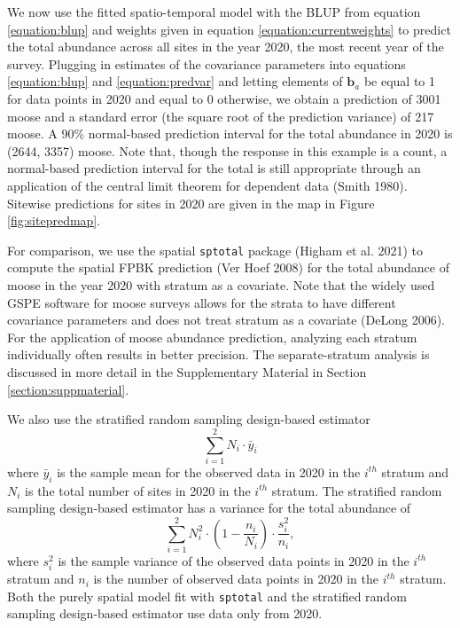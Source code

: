 \documentclass[smallextended]{svjour3}       %
\begin{document}
We now use the fitted spatio-temporal model with the BLUP from equation
\ref{equation:blup} and weights given in equation
\ref{equation:currentweights} to predict the total abundance across all
sites in the year 2020, the most recent year of the survey. Plugging in
estimates of the covariance parameters into equations
\ref{equation:blup} and \ref{equation:predvar} and letting elements of
\(\mathbf{b}_a\) be equal to 1 for data points in 2020 and equal to 0
otherwise, we obtain a prediction of 3001 moose and a standard error
(the square root of the prediction variance) of 217 moose. A 90\%
normal-based prediction interval for the total abundance in 2020 is
(2644, 3357) moose. Note that, though the response in this example is a
count, a normal-based prediction interval for the total is still
appropriate through an application of the central limit theorem for
dependent data (Smith 1980). Sitewise predictions for sites in 2020 are
given in the map in Figure \ref{fig:sitepredmap}.

For comparison, we use the spatial \texttt{sptotal} package (Higham et
al. 2021) to compute the spatial FPBK prediction (Ver Hoef 2008) for the
total abundance of moose in the year 2020 with stratum as a covariate.
Note that the widely used GSPE software for moose surveys allows for the
strata to have different covariance parameters and does not treat
stratum as a covariate (DeLong 2006). For the application of moose
abundance prediction, analyzing each stratum individually often results
in better precision. The separate-stratum analysis is discussed in more
detail in the Supplementary Material in Section
\ref{section:suppmaterial}.

We also use the stratified random sampling design-based estimator
\mbox{} \begin{equation*}
\sum_{i = 1}^{2} N_i \cdot \bar{y}_i
\end{equation*} \noindent where \(\bar{y}_i\) is the sample mean for the
observed data in 2020 in the \(i^{th}\) stratum and \(N_i\) is the total
number of sites in 2020 in the \(i^{th}\) stratum. The stratified random
sampling design-based estimator has a variance for the total abundance
of \mbox{} \begin{equation*}
\sum_{i = 1}^{2} N_i^2 \cdot \left(1 - \frac{n_i}{N_i}\right) \cdot \frac{s^2_i}{n_i},
\end{equation*} \noindent where \(s^2_i\) is the sample variance of the
observed data points in 2020 in the \(i^{th}\) stratum and \(n_i\) is
the number of observed data points in 2020 in the \(i^{th}\) stratum.
Both the purely spatial model fit with \texttt{sptotal} and the
stratified random sampling design-based estimator use data only from
2020.
\end{document}
